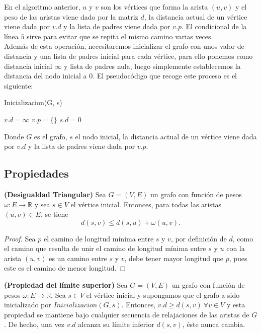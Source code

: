 En el algoritmo anterior, $u$ y $v$ son los vértices que forma la arista $(u,v)$ y el peso de las aristas viene dado por la matriz $d$, la distancia actual de un vértice viene dada por $v.d$ y la lista de padres viene dada por $v.p$. El condicional de la línea $5$ sirve para evitar que se repita el mismo camino varias veces.\\

Además de esta operación, necesitaremos inicializar el grafo con unos valor de distancia y una lista de padres inicial para cada vértice, para ello ponemos como distancia inicial $\infty$ y lista de padres nula, luego simplemente establecemos la distancia del nodo inicial a $0$. El pseudocódigo que recoge este proceso es el siguiente:

\begin{breakablealgorithm}
	\caption{Inicializacion(G, s)}
	\begin{algorithmic}[1]
			\State $v.d = \infty$
			\State $v.p = \{\}$
		\EndFor
		\State $s.d = 0$
	\end{algorithmic}
\end{breakablealgorithm}

Donde $G$ es el grafo, $s$ el nodo inicial, la distancia actual de un vértice viene dada por $v.d$ y la lista de padres viene dada por $v.p$. \\

\subsection{Propiedades}

\begin{lema}\label{lema:des_tri}
	\textbf{(Desigualdad Triangular)} Sea $G=(V,E)$ un grafo con función de pesos $\omega : E\rightarrow \mathbb{R}$ y sea $s\in V$ el vértice inicial. Entonces, para todas las aristas $(u,v)\in E$, se tiene
	$$d(s,v)\leq d(s,u)+\omega (u,v).$$
\end{lema}

\begin{proof}
	Sea $p$ el camino de longitud mínima entre $s$ y $v$, por definición de $d$, como el camino que resulta de unir el camino de longitud mínima entre $s$ y $u$ con la arista $(u,v)$ es un camino entre $s$ y $v$, debe tener mayor longitud que $p$, pues este es el camino de menor longitud.
\end{proof}

\begin{lema}\label{lema:lim_sup}
	\textbf{(Propiedad del límite superior)} Sea $G=(V,E)$ un grafo con función de pesos $\omega : E\rightarrow \mathbb{R}$. Sea $s\in V$ el vértice inicial y supongamos que el grafo a sido inicializado por $Inicializacion(G,s)$. Entonces, $v.d \geq d(s,v)\ \forall v\in V$ y esta propiedad se mantiene bajo cualquier secuencia de relajaciones de las aristas de $G$. De hecho, una vez $v.d$ alcanza su límite inferior $d(s,v)$, éste nunca cambia.
\end{lema}

